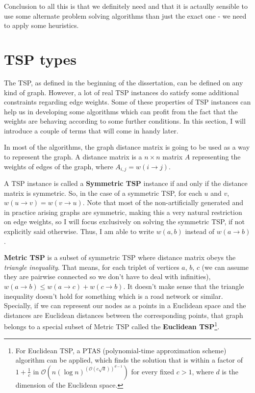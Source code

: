\documentclass[12pt,twoside,notitlepage]{report}
\begin{document}
\medskip

Conclusion to all this is that we definitely need and that it is actaully sensible to use some alternate problem solving algorithms than just the exact one - we need to apply some heuristics. 

\section{TSP types}

The TSP, as defined in the beginning of the dissertation, can be defined on any kind of graph. However, a lot of real TSP instances do satisfy some additional constraints regarding edge weights. Some of these properties of TSP instances can help us in developing some algorithms which can profit from the fact that the weights are behaving according to some further conditions. In this section, I will introduce a couple of terms that will come in handy later.

In most of the algorithms, the graph distance matrix is going to be used as a way to represent the graph. A distance matrix is a $n \times n$ matrix $A$ representing the weights of edges of the graph, where $A_{i, j} = w(i \rightarrow j)$.

\smallskip

A TSP instance is called a {\bf Symmetric TSP} instance if and only if the distance matrix is symmetric. So, in the case of a symmetric TSP, for each $u$ and $v$, $w(u \rightarrow v) = w(v \rightarrow u)$. Note that most of the non-artificially generated and in practice arising graphs are symmetric, making this a very natural restriction on edge weights, so I will focus exclusively on solving the symmetric TSP, if not explicitly said otherwise. Thus, I am able to write $w(a, b)$ instead of $w(a \rightarrow b)$.

{\bf Metric TSP} is a subset of symmetric TSP where distance matrix obeys the {\it triangle inequality}. That means, for each triplet of vertices $a$, $b$, $c$ (we can assume they are pairwise connected so we don't have to deal with infinities), $w(a \rightarrow b) \leq w(a \rightarrow c) + w(c \rightarrow b)$. It doesn't make sense that the triangle inequality doesn't hold for something which is a road network or similar. Specially, if we can represent our nodes as a points in a Euclidean space and the distances are Euclidean distances between the corresponding points, that graph belongs to a special subset of Metric TSP called the {\bf Euclidean TSP}\footnote{For Euclidean TSP, a PTAS\cite{Arora_1998} (polynomial-time approximation scheme) algorithm can be applied, which finds the solution that is within a factor of $1 + \frac{1}{c}$  in $\mathcal{O}(n(\log n)^{(\mathcal{O}(c \sqrt{d}))^{d - 1}})$ for every fixed $c > 1$, where $d$ is the dimension of the Euclidean space.}. %
\end{document}
